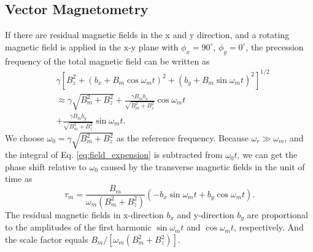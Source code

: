 \documentclass[prx,twocolumn,10pt,nofootinbib]{revtex4-1}
\begin{document}
\subsection{Vector Magnetometry}

If there are residual magnetic fields in the x and y direction, and a rotating magnetic field is applied in the x-y plane with $\phi_x=90^{\circ}$, $\phi_y=0^{\circ}$, the precession frequency of the total magnetic field can be written as
\begin{equation}
	\begin{aligned}
	&\gamma [B_z^2+(b_x+B_m\cos\omega_m t)^2 +(b_y+B_m\sin\omega_m t)^2]^{1/2}\\
	&\approx \gamma \sqrt{B_m^2+B_z^2}+\frac{\gamma B_m b_x}{\sqrt{B_m^2+B_z^2}}\cos\omega_m t\\
	&+\frac{\gamma B_m b_y}{\sqrt{B_m^2+B_z^2}}\sin\omega_m t.
	\end{aligned}
	\label{eq:field_expension}
\end{equation}
We choose $\omega_0= \gamma \sqrt{B_m^2+B_z^2}$ as the reference frequency. Because $\omega_r \gg \omega_m$, and the integral of Eq. \ref{eq:field_expension} is subtracted from $\omega_0 t$, we can get the phase shift relative to $\omega_0$ caused by the transverse magnetic fields in the unit of time as
\begin{equation}
    \tau_m = \frac{B_m}{\omega_m (B_m^2+B_z^2)}(-b_x \sin\omega_m t + b_y\cos\omega_m t).
    \label{eq:phi_m}
\end{equation}
The residual magnetic fields in x-direction $b_x$ and y-direction $b_y$ are proportional to the amplitudes of the first harmonic $\sin \omega_m t$ and $\cos \omega_m t$, respectively. And the scale factor equals $B_m/[\omega_m (B_m^2+B_z^2)]$.
\end{document}
